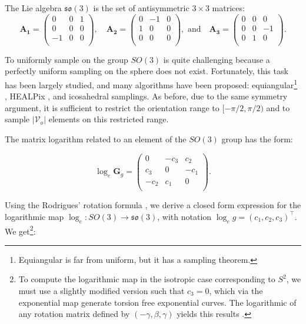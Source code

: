 \documentclass{article}
\begin{document}
The Lie algebra $\mathfrak{so}(3)$ is the set of antisymmetric $3 \times 3$ matrices:
\begin{equation}
\boldsymbol{A_1} =
\left(
\begin{array}{ccc}
0 & 0 & 1 \\
0 & 0 & 0 \\
-1 & 0 & 0 \\
\end{array}
\right)
,\quad
\boldsymbol{A_2} =
\left(
\begin{array}{ccc}
0 & -1 & 0  \\
1 & 0 & 0 \\
0 & 0 & 0 \\
\end{array}
\right)
, \text{ and} \quad
\boldsymbol{A_3} =
\left(
\begin{array}{ccc}
0 & 0 & 0 \\
0 & 0 & -1 \\
0 & 1 & 0 \\
\end{array}
\right).
\end{equation}

To uniformly sample on the group $SO(3)$ is quite challenging because a perfectly uniform sampling on the sphere does not exist. Fortunately, this task has been largely studied, and many algorithms have been proposed: equiangular\footnote{Equiangular is far from uniform, but it has a sampling theorem.} \citep{driscoll1994computing}, HEALPix \citep{gorski2005healpix}, and icosahedral \citep{baumgardner1985icosahedral} samplings. As before, due to the same symmetry argument, it is sufficient to restrict the orientation range to $[-\pi/2, \pi/2)$ and to sample $|\mathcal{V}_o|$ elements on this restricted range.

The matrix logarithm related to an element of the $SO(3)$ group has the form:

\begin{equation}
\log_e \boldsymbol{G}_g =
\left(
\begin{array}{ccc}
0 & -c_3 & c_2 \\
c_3 & 0 & -c_1 \\
-c_2 & c_1 & 0 \\
\end{array}
\right).
\end{equation}

Using the Rodrigues' rotation formula \citep{rodrigues1840lois}, we derive a closed form expression for the logarithmic map $\log_{e} : SO(3) \to \mathfrak{so}(3)$, with notation $\log_{e} g = (c_1, c_2, c_3)^\top$. We get\footnote{To compute the logarithmic map in the isotropic case corresponding to $S^2$, we must use a slightly modified version such that $c_3 = 0$, which via the exponential map generate torsion free exponential curves. The logarithmic of any rotation matrix defined by $(-\gamma, \beta, \gamma)$ yields this results \citep{bekkers2019b, portegies2015new}.}:
\end{document}
